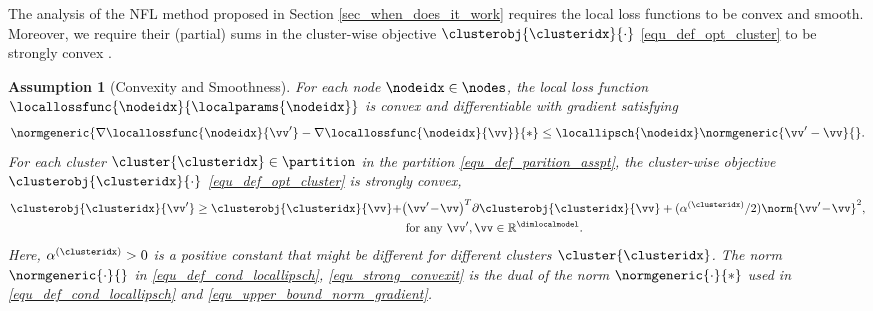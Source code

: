 \documentclass[lettersize,journal]{IEEEtran}
\newcommand\strongconvparam[1]{\alpha^{(#1)}}
\newtheorem{assumption}{Assumption}
\begin{document}

The analysis of the NFL method proposed in Section \ref{sec_when_does_it_work} requires the 
local loss functions to be convex and smooth. Moreover, we require their (partial) sums in the cluster-wise 
objective $\clusterobj{\clusteridx}{\cdot}$ \eqref{equ_def_opt_cluster} to be strongly 
convex \cite[Exercise 1.9]{BertCvxAnalOpt}. 
\begin{assumption}[Convexity and Smoothness]
	\label{asspt_FIM_lower_bound}
For each node $\nodeidx \in \nodes$, the local loss function $\locallossfunc{\nodeidx}{\localparams{\nodeidx}}$ is convex 
and differentiable with gradient satisfying 
\begin{equation}
	\label{equ_def_cond_locallipsch}
\normgeneric{ \nabla \locallossfunc{\nodeidx}{\vv'} - \nabla \locallossfunc{\nodeidx}{\vv}}{*} \leq \locallipsch{\nodeidx} \normgeneric{\vv'- \vv}{}. 
 \vspace{-2mm}
\end{equation} 
For each cluster $\cluster{\clusteridx} \in \partition$ in the partition \eqref{equ_def_parition_asspt}, 
the cluster-wise objective $\clusterobj{\clusteridx}{\cdot}$ \eqref{equ_def_opt_cluster} is strongly convex, 
\begin{equation} 
\label{equ_strong_convexit}
\begin{aligned}
    \clusterobj{\clusteridx}{\vv'} \geq \clusterobj{\clusteridx}{\vv}  +
 &{\big( \vv' \!-\! \vv \big)^{T} \partial \clusterobj{\clusteridx}{\vv} + (\strongconvparam{\clusteridx}/2) \norm{\vv' \!-\! \vv}^{2},} \\
 &{\mbox{ for any } \vv', \vv \in \mathbb{R}^{\dimlocalmodel}.} 
\end{aligned}
 \vspace{-2mm}
\end{equation} 
Here, $\strongconvparam{\clusteridx}> 0$ is a positive constant that might be different for different clusters $\cluster{\clusteridx}$. 
The norm $\normgeneric{\cdot}{}$ in \eqref{equ_def_cond_locallipsch}, \eqref{equ_strong_convexit} is the dual of 
the norm $\normgeneric{\cdot}{*}$ used in \eqref{equ_def_cond_locallipsch} and \eqref{equ_upper_bound_norm_gradient}. 
\end{assumption}  
\end{document}
